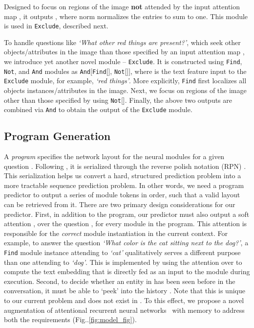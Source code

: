 \documentclass[runningheads]{llncs}
\makeatletter
\DeclareRobustCommand\onedot{\futurelet\@let@token\@onedot}
\def\@onedot{\ifx\@let@token.\else.\null\fi\xspace}
\def\Fig{Fig\onedot}
\newcommand{\myparagraph}[1]{\vspace{0pt}\noindent{\bf #1}}
\makeatother
\begin{document}
\myparagraph{\texttt{Not} Module.}
Designed to focus on regions of the image \textbf{not} attended by the input 
attention map , it outputs , where 
norm normalizes the entries to sum to one.
This module is used in \texttt{Exclude}, described next.

\myparagraph{\texttt{Exclude} Module.}
To handle questions like \textit{`What other red things are present?'}, which 
seek other objects/attributes in the image than those specified by an input
attention map , we introduce yet another novel module -- \texttt{Exclude}.
It is constructed using \texttt{Find}, \texttt{Not}, and \texttt{And} modules
as  \texttt{And}[\texttt{Find}[], \texttt{Not}[]],
where  is the text feature input to the \texttt{Exclude} module, for 
example, \textit{`red things'}.
More explicitly, \texttt{Find} first localizes all objects instances/attributes 
in the image.
Next, we focus on regions of the image other than those specified by  using 
\texttt{Not}[].
Finally, the above two outputs are combined via \texttt{And} to obtain the 
output  of the \texttt{Exclude} module.


\subsection{Program Generation}
\label{sec:prog_predict}
A \textit{program} specifies the network layout for the neural modules 
for a given question .
Following \cite{hu2017learning}, it is serialized through the reverse 
polish notation (RPN) \cite{10.2307/2001990}.
This serialization helps us convert a hard, structured prediction problem into
a more tractable sequence prediction problem.
In other words, we need a program predictor to output a series of module
tokens in order, such that a valid layout can be retrieved from it.
There are two primary design considerations for our predictor.
First, in addition to the program, our predictor must also output a
soft attention , over the question , for every module 
 in the program.
This attention is responsible for the \emph{correct} module instantiation
in the current context.
For example, to answer the question \textit{`What color is the cat sitting next
to the dog?'}, a \texttt{Find} module instance attending to \textit{`cat'}
qualitatively serves a different purpose than one attending to \textit{`dog'}.
This is implemented by using the attention over  to compute the text 
embedding  that is directly fed as an input to the module during 
execution.
Second, to decide whether an entity in  has been seen before in the
conversation, it must be able to `peek' into the history .
Note that this is unique to our current problem and does not exist in \cite{hu2017learning}.
To this effect, we propose a novel augmentation of attentional recurrent neural 
networks~\cite{bahdanau_iclr15} with memory \cite{DBLP:journals/corr/WestonCB14}
to address both the requirements (\Fig\ref{fig:model_fig}).
\end{document}
